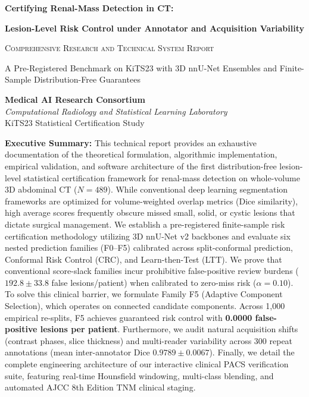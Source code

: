 \documentclass[11pt,a4paper]{report}
\begin{document}
\begin{titlepage}
    \centering
    \vspace*{1.5cm}
    
    {\Huge\bfseries Certifying Renal-Mass Detection in CT:\par}
    \vspace{0.4cm}
    {\LARGE\bfseries Lesion-Level Risk Control under Annotator and Acquisition Variability\par}
    
    \vspace{1.2cm}
    {\Large\scshape Comprehensive Research and Technical System Report\par}
    \vspace{0.5cm}
    {\large A Pre-Registered Benchmark on KiTS23 with 3D nnU-Net Ensembles and Finite-Sample Distribution-Free Guarantees\par}
    
    \vspace{2.2cm}
    
    \textbf{Medical AI Research Consortium}\\[0.2cm]
    \textit{Computational Radiology and Statistical Learning Laboratory}\\[0.1cm]
    KiTS23 Statistical Certification Study
    
    \vfill
    
    \begin{minipage}{0.88\textwidth}
        \small
        \textbf{Executive Summary:} This technical report provides an exhaustive documentation of the theoretical formulation, algorithmic implementation, empirical validation, and software architecture of the first distribution-free lesion-level statistical certification framework for renal-mass detection on whole-volume 3D abdominal CT ($N=489$). While conventional deep learning segmentation frameworks are optimized for volume-weighted overlap metrics (Dice similarity), high average scores frequently obscure missed small, solid, or cystic lesions that dictate surgical management. We establish a pre-registered finite-sample risk certification methodology utilizing 3D nnU-Net v2 backbones and evaluate six nested prediction families (F0--F5) calibrated across split-conformal prediction, Conformal Risk Control (CRC), and Learn-then-Test (LTT). We prove that conventional score-slack families incur prohibitive false-positive review burdens ($192.8 \pm 33.8$ false lesions/patient) when calibrated to zero-miss risk ($\alpha = 0.10$). To solve this clinical barrier, we formulate Family F5 (Adaptive Component Selection), which operates on connected candidate components. Across 1,000 empirical re-splits, F5 achieves guaranteed risk control with \textbf{0.0000 false-positive lesions per patient}. Furthermore, we audit natural acquisition shifts (contrast phases, slice thickness) and multi-reader variability across 300 repeat annotations (mean inter-annotator Dice $0.9789 \pm 0.0067$). Finally, we detail the complete engineering architecture of our interactive clinical PACS verification suite, featuring real-time Hounsfield windowing, multi-class blending, and automated AJCC 8th Edition TNM clinical staging.
    \end{minipage}
    

\end{titlepage}
\end{document}
